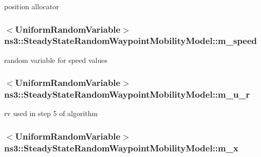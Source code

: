 position allocator 

\subsubsection[{\texorpdfstring{m\+\_\+speed}{m_speed}}]{$<${\bf Uniform\+Random\+Variable}$>$ ns3\+::\+Steady\+State\+Random\+Waypoint\+Mobility\+Model\+::m\+\_\+speed\hspace{0.3cm}{\ttfamily [private]}}\hypertarget{classns3_1_1SteadyStateRandomWaypointMobilityModel_a6bf20d5e0bbe779c2e7a8a820a9920c8}{}\label{classns3_1_1SteadyStateRandomWaypointMobilityModel_a6bf20d5e0bbe779c2e7a8a820a9920c8}


random variable for speed values 

\subsubsection[{\texorpdfstring{m\+\_\+u\+\_\+r}{m_u_r}}]{$<${\bf Uniform\+Random\+Variable}$>$ ns3\+::\+Steady\+State\+Random\+Waypoint\+Mobility\+Model\+::m\+\_\+u\+\_\+r\hspace{0.3cm}{\ttfamily [private]}}\hypertarget{classns3_1_1SteadyStateRandomWaypointMobilityModel_a08d9ee8057dda08d1bd8ea696fd099c8}{}\label{classns3_1_1SteadyStateRandomWaypointMobilityModel_a08d9ee8057dda08d1bd8ea696fd099c8}


rv used in step 5 of algorithm 

\subsubsection[{\texorpdfstring{m\+\_\+x}{m_x}}]{$<${\bf Uniform\+Random\+Variable}$>$ ns3\+::\+Steady\+State\+Random\+Waypoint\+Mobility\+Model\+::m\+\_\+x\hspace{0.3cm}{\ttfamily [private]}}\hypertarget{classns3_1_1SteadyStateRandomWaypointMobilityModel_ab1524438e74aa8e648c5e03f2d1bf85c}{}\label{classns3_1_1SteadyStateRandomWaypointMobilityModel_ab1524438e74aa8e648c5e03f2d1bf85c}


